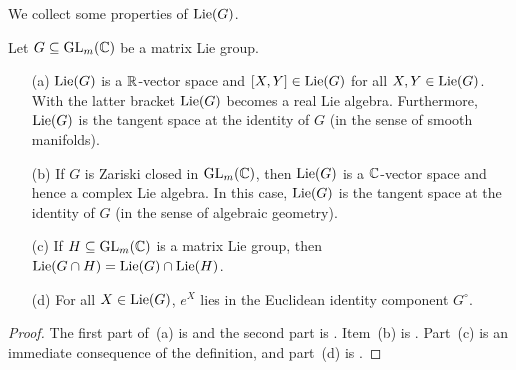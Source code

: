 We collect some properties of $\operatorname{Lie}(G)$.

\begin{prop}\label{prop:LieAlgebraProperties}
	Let $G \subseteq \operatorname{GL}_m(\mathbb C)$ be a matrix Lie group.
	\begin{itemize}
		\item[(a)] $\operatorname{Lie}(G)$ is a $\mathbb R$-vector space and $[X,Y] \in \operatorname{Lie}(G)$ for all $X,Y \in \operatorname{Lie}(G)$. With the latter bracket $\operatorname{Lie}(G)$ becomes a real Lie algebra. Furthermore, $\operatorname{Lie}(G)$ is the tangent space at the identity of $G$ (in the sense of smooth manifolds).
		
		\item[(b)] If $G$ is Zariski closed in $\operatorname{GL}_m(\mathbb C)$, then $\operatorname{Lie}(G)$ is a $\mathbb C$-vector space and hence a complex Lie algebra. In this case, $\operatorname{Lie}(G)$ is the tangent space at the identity of $G$ (in the sense of algebraic geometry).
		
		\item[(c)] If $H \subseteq \operatorname{GL}_m(\mathbb C)$ is a matrix Lie group, then  $\operatorname{Lie}(G \cap H) = \operatorname{Lie}(G) \cap \operatorname{Lie}(H)$.
		
		\item[(d)] For all $X \in \operatorname{Lie}(G)$, $e^X$ lies in the Euclidean identity component $G^\circ$.
	\end{itemize}
\end{prop}

\begin{proof}
	The first part of~(a) is \cite[Theorem~3.20]{HallBook} and the second part is \cite[Corollary~3.46]{HallBook}. Item~(b) is \cite[Theorem~2.8]{Wallach}. Part~(c) is an immediate consequence of the definition, and part~(d) is \cite[Proposition~3.19]{HallBook}.
\end{proof}


